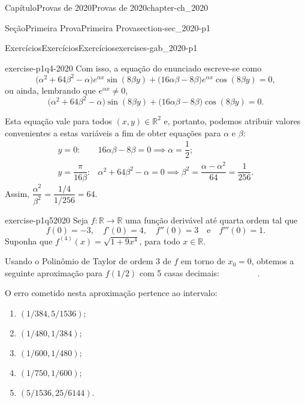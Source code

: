 \documentclass[oneside,10pt,]{book}
\numberwithin{equation}{section}
\newcommand{\R}{\mathbb R}
\begin{document}
\begin{chapterptx}{Capítulo}{Provas de 2020}{}{Provas de 2020}{}{}{chapter-ch_2020}
\begin{sectionptx}{Seção}{Primeira Prova}{}{Primeira Prova}{}{}{section-sec_2020-p1}
\begin{exercises-subsection-numberless}{Exercícios}{Exercícios}{}{Exercícios}{}{}{exercises-gab_2020-p1}
\begin{divisionexercise}{4}{}{}{exercise-p1q4-2020}
Com isso, a equação do enunciado escreve-se como%
\begin{equation*}
\big(\alpha^2+64\beta^2-\alpha\big)e^{\alpha
x}\sin(8\beta y)+\big(16\alpha\beta-8\beta\big)e^{\alpha
x}\cos(8\beta y)=0,
\end{equation*}
ou ainda, lembrando que \(e^{\alpha x}\neq 0\),%
\begin{equation*}
\big(\alpha^2+64\beta^2-\alpha\big)\sin(8\beta
y)+\big(16\alpha\beta-8\beta\big)\cos(8\beta y)=0.
\end{equation*}
%
\par
Esta equação vale para todos \((x,y)\in\R^2\) e, portanto, podemos atribuir valores convenientes a estas variáveis a fim de obter equações para \(\alpha\) e \(\beta\):%
\begin{align*}
y=0\colon& 16\alpha\beta-8\beta=0\implies
\alpha=\dfrac{1}{2};\\
y=\dfrac{\pi}{16\beta}\colon& \alpha^2+64\beta^2-\alpha=0\implies
\beta^2=\dfrac{\alpha-\alpha^2}{64}=\dfrac{1}{256}.
\end{align*}
Assim, \(\dfrac{\alpha^2}{\beta^2}=\dfrac{1/4}{1/256}=64\).%
\end{divisionexercise}%
\begin{divisionexercise}{5}{}{}{exercise-p1q52020}%
Seja \(f\colon\R\to\R\) uma função derivável até quarta ordem tal que%
\begin{equation*}
f(0) = -3,\quad f’(0) = 4,\quad f''(0) =
3\quad \mbox {e}\quad f'''(0) = 1.
\end{equation*}
Suponha que \(f^{(4)}(x) = \sqrt {1+9x^4}\), para todo \(x
\in \mathbb {R}\).%
\par
Usando o Polinômio de Taylor de ordem \(3\) de \(f\) em torno de \(x_0 = 0\), obtemos a seguinte aproximação para \(f(1/2)\) com 5 casas decimais: \(\boxed{\phantom{-0,60417}}\).%
\par
O erro cometido nesta aproximação pertence ao intervalo:%
\begin{multicols}{3}
\begin{enumerate}[label=\alph*]
\item{}\(\displaystyle (1/384, 5/1536);\)%
\item{}\(\displaystyle (1/480, 1/384);\)%
\item{}\(\displaystyle (1/600, 1/480);\)%
\item{}\(\displaystyle (1/750, 1/600);\)%
\item{}\(\displaystyle (5/1536, 25/6144).\)%
\end{enumerate}
\end{multicols}

\end{divisionexercise}
\end{exercises-subsection-numberless}
\end{sectionptx}
\end{chapterptx}
\end{document}
